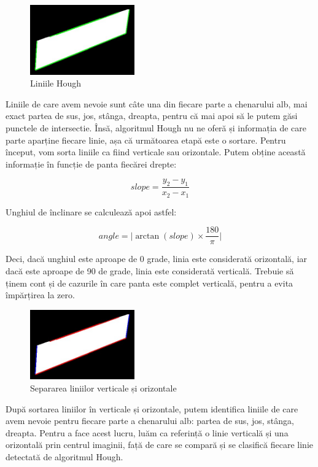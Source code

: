 \documentclass[a4paper,12pt]{report}
\begin{document}
\begin{figure}[h]
    \centering
    \includegraphics[width=0.4\textwidth]{images/lines.jpg}
    \caption{Liniile Hough}
\end{figure}
\FloatBarrier

Liniile de care avem nevoie sunt câte una din fiecare parte a chenarului alb, mai exact partea de sus, jos, stânga, dreapta, pentru că mai apoi să le putem găsi punctele de intersectie. Însă, algoritmul Hough nu ne oferă și informația de care parte aparține fiecare linie, așa că următoarea etapă este o sortare. Pentru început, vom sorta liniile ca fiind verticale sau orizontale. Putem obține această informație în funcție de panta fiecărei drepte:

\[
    slope = \frac{y_2 - y_1}{x_2 - x_1}
\]

Unghiul de înclinare se calculează apoi astfel:

\[
    angle = \lvert \arctan(slope) \times \frac{180}{\pi} \rvert
\]

Deci, dacă unghiul este aproape de 0 grade, linia este considerată orizontală, iar dacă este aproape de 90 de grade, linia este considerată verticală. Trebuie să ținem cont și de cazurile în care panta este complet verticală, pentru a evita împărțirea la zero.

\begin{figure}[h]
    \centering
    \includegraphics[width=0.4\textwidth]{images/horizontal_vertical_lines.jpg}
    \caption{Separarea liniilor verticale și orizontale}
\end{figure}
\FloatBarrier

După sortarea liniilor în verticale și orizontale, putem identifica liniile de care avem nevoie pentru fiecare parte a chenarului alb: partea de sus, jos, stânga, dreapta. Pentru a face acest lucru, luăm ca referință o linie verticală și una orizontală prin centrul imaginii, față de care se compară și se clasifică fiecare linie detectată de algoritmul Hough.
\end{document}
